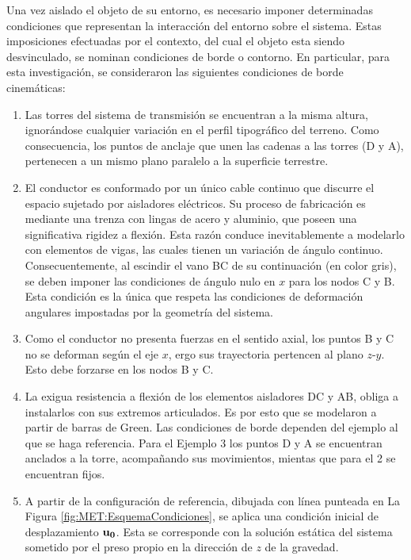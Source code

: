 Una vez aislado el objeto de su entorno, es necesario imponer determinadas condiciones que representan la interacción del entorno sobre el sistema. Estas imposiciones efectuadas por el contexto, del cual el objeto esta siendo desvinculado, se nominan condiciones de borde o contorno. En particular, para esta investigación, se consideraron las siguientes condiciones de borde cinemáticas:

\begin{enumerate}
	\item Las torres del sistema de transmisión se encuentran a la misma altura, ignorándose cualquier variación en el perfil tipográfico del terreno. Como consecuencia, los puntos de anclaje que unen las cadenas a las torres (D y A), pertenecen a un mismo plano paralelo a la superficie terrestre.
	\item  El conductor es conformado por un único cable continuo que discurre el espacio sujetado por aisladores eléctricos. Su proceso de fabricación es mediante una trenza con lingas de acero y aluminio, que poseen una significativa rigidez a flexión. Esta razón conduce inevitablemente a modelarlo con elementos de vigas, las cuales tienen un variación de ángulo continuo. Consecuentemente, al escindir el vano BC de su continuación (en color gris), se deben imponer las condiciones de ángulo nulo en $x$ para los nodos C y B. Esta condición es la única que respeta las condiciones de deformación angulares impostadas por la geometría del sistema. \item Como el conductor no presenta fuerzas en el sentido axial, los puntos B y C no se deforman según el eje $x$, ergo sus trayectoria pertencen al plano $z$-$y$. Esto debe forzarse en los nodos B y C. 
	\item La exigua resistencia a flexión de los elementos aisladores DC y AB, obliga a instalarlos con sus extremos articulados. Es por esto que se modelaron a partir de barras de Green. Las condiciones de borde dependen del ejemplo al que se haga referencia. Para el Ejemplo 3 los puntos D y A se encuentran anclados a la torre, acompañando sus movimientos, mientas que para el 2 se encuentran fijos.
	\item A partir de la configuración de referencia, dibujada con línea punteada en La Figura \ref{fig:MET:EsquemaCondiciones}, se aplica una condición inicial de desplazamiento $\bf{u}_0$. Esta se corresponde con la solución estática del sistema sometido por el preso propio en la dirección de $z$ de la gravedad.
\end{enumerate} 


